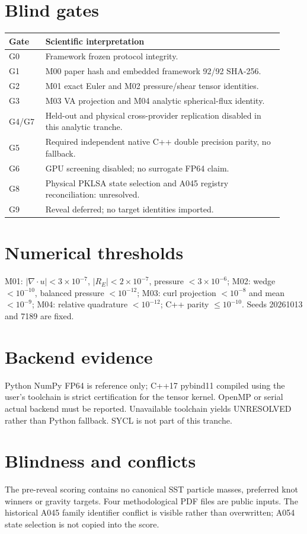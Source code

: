 \documentclass[10pt,a4paper]{article}
\begin{document}
\section{Blind gates}
\begin{longtable}{p{0.12\linewidth}p{0.80\linewidth}}\toprule Gate & Scientific interpretation\\\midrule
G0 & Framework frozen protocol integrity.\\
G1 & M00 paper hash and embedded framework 92/92 SHA-256.\\
G2 & M01 exact Euler and M02 pressure/shear tensor identities.\\
G3 & M03 VA projection and M04 analytic spherical-flux identity.\\
G4/G7 & Held-out and physical cross-provider replication disabled in this analytic tranche.\\
G5 & Required independent native C++ double precision parity, no fallback.\\
G6 & GPU screening disabled; no surrogate FP64 claim.\\
G8 & Physical PKLSA state selection and A045 registry reconciliation: unresolved.\\
G9 & Reveal deferred; no target identities imported.\\\bottomrule\end{longtable}
\section{Numerical thresholds}
M01: $|\nabla\cdot u|<3\times10^{-7}$, $|R_E|<2\times10^{-7}$, pressure $<3\times10^{-6}$; M02: wedge $<10^{-10}$, balanced pressure $<10^{-12}$; M03: curl projection $<10^{-8}$ and mean $<10^{-9}$; M04: relative quadrature $<10^{-12}$; C++ parity $\le10^{-10}$. Seeds 20261013 and 7189 are fixed.
\section{Backend evidence}
Python NumPy FP64 is reference only; C++17 pybind11 compiled using the user's toolchain is strict certification for the tensor kernel. OpenMP or serial actual backend must be reported. Unavailable toolchain yields UNRESOLVED rather than Python fallback. SYCL is not part of this tranche.
\section{Blindness and conflicts}
The pre-reveal scoring contains no canonical SST particle masses, preferred knot winners or gravity targets. Four methodological PDF files are public inputs. The historical A045 family identifier conflict is visible rather than overwritten; A054 state selection is not copied into the score.
\end{document}
